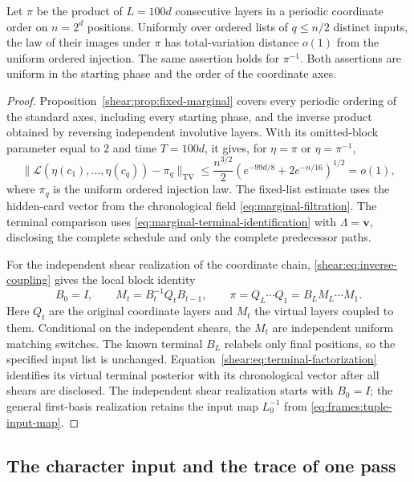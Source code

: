 \begin{lemma}\label{frames:char:half-list}
Let $\pi$ be the product of $L=100d$ consecutive layers in a periodic
coordinate order on $n=2^d$ positions. Uniformly over ordered lists of
$q\le n/2$ distinct inputs, the law of their images under $\pi$ has
total-variation distance $o(1)$ from the uniform ordered injection.
The same assertion holds for $\pi^{-1}$. Both assertions are uniform
in the starting phase and the order of the coordinate axes.
\end{lemma}

\begin{proof}
Proposition~\ref{shear:prop:fixed-marginal} covers every periodic
ordering of the standard axes, including every starting phase, and
the inverse product obtained by reversing independent involutive
layers. With its omitted-block parameter equal to $2$ and time
$T=100d$, it gives, for $\eta=\pi$ or $\eta=\pi^{-1}$,
\[
 \|\mathcal L(\eta(c_1),\ldots,\eta(c_q))-\pi_q\|_{\mathrm{TV}}
 \le\frac{n^{3/2}}2
       \left(e^{-99d/8}+2e^{-n/16}\right)^{1/2}=o(1),
\]
where $\pi_q$ is the uniform ordered injection law. The fixed-list
estimate uses the hidden-card vector from the chronological field
\eqref{eq:marginal-filtration}.
The terminal comparison uses
\eqref{eq:marginal-terminal-identification} with $\Lambda=\mathbf v$,
disclosing the complete schedule and only the complete predecessor
paths.

For the independent shear realization of the coordinate chain,
\eqref{shear:eq:inverse-coupling} gives the local block identity
\begin{equation}\label{frames:char:conjugated-layers}
 B_0=I,\qquad M_t=B_t^{-1}Q_tB_{t-1},\qquad
 \pi=Q_L\cdots Q_1=B_LM_L\cdots M_1.
\end{equation}
Here $Q_t$ are the original coordinate layers and $M_t$ the virtual
layers coupled to them. Conditional on the independent shears, the
$M_t$ are independent uniform matching switches. The known terminal
$B_L$ relabels only final positions, so the specified input list is
unchanged. Equation~\eqref{shear:eq:terminal-factorization} identifies
its virtual terminal posterior with its chronological vector after all
shears are disclosed. The independent shear realization
starts with $B_0=I$;
the general first-basis realization retains the input map
$L_0^{-1}$ from \eqref{eq:frames:tuple-input-map}.
\end{proof}

\subsection{The character input and the trace of one pass}
\label{frames:char:trace-subsection}

